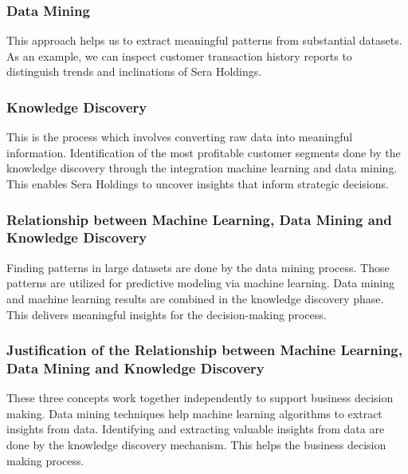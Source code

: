 \documentclass[12pt,a4Paper]{article}
\begin{document}
\subsubsection{Data Mining}
This approach helps us to extract meaningful patterns from substantial datasets. As an example, we can inspect customer transaction history reports to distinguish trends and inclinations of Sera Holdings.
\subsubsection{Knowledge Discovery}
This is the process which involves converting raw data into meaningful information. Identification of the most profitable customer segments done by the knowledge discovery through the integration machine learning and data mining. This enables Sera Holdings to uncover insights that inform strategic decisions.
\subsubsection{Relationship between Machine Learning, Data Mining and Knowledge Discovery}
Finding patterns in large datasets are done by the data mining process. Those patterns are utilized for predictive modeling via machine learning. Data mining and machine learning results are combined in the knowledge discovery phase. This delivers meaningful insights for the decision-making process.\\[12pt]

\subsubsection{Justification of the Relationship between Machine Learning, Data Mining and Knowledge Discovery}
These three concepts work together independently to support business decision making. Data mining techniques help machine learning algorithms to extract insights from data. Identifying and extracting valuable insights from data are done by the knowledge discovery mechanism. This helps the business decision making process.
\end{document}
